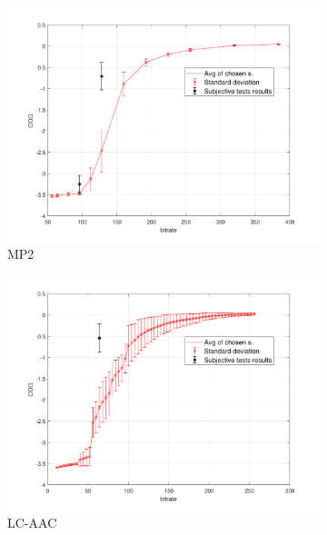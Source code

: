 \begin{figure}[h]
    \centering
    \begin{subfigure}{.5\textwidth}
        \centering
        \includegraphics[width=1\linewidth]{pic/objective/mp2Advanced.pdf}
        \caption{MP2}
        \label{app:adv:sub1}
    \end{subfigure}%
    \begin{subfigure}{.5\textwidth}
        \centering
        \includegraphics[width=1\linewidth]{pic/objective/lcAdvanced.pdf}
        \caption{LC-AAC}
        \label{app:adv:sub2}
    \end{subfigure}
    \\
        \begin{subfigure}{.5\textwidth}

\end{subfigure}
\end{figure}
